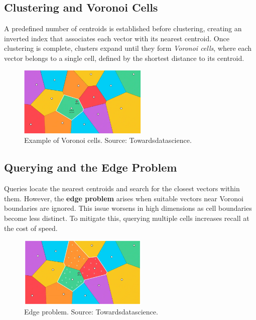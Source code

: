 \subsection{Clustering and Voronoi Cells}
A predefined number of centroids is established before clustering, creating an inverted index that associates each vector with its nearest centroid. Once clustering is complete, clusters expand until they form \textit{Voronoi cells}, where each vector belongs to a single cell, defined by the shortest distance to its centroid.
\begin{figure}[h]
    \centering
\includegraphics[width=0.55\textwidth]{IMAGES/immagine_2025-02-27_130909576.png}
    \caption{Example of Voronoi cells. Source: Towardsdatascience.\footnotemark[2]}
    \label{fig:Voronoi}
\end{figure}
\subsection{Querying and the Edge Problem}
Queries locate the nearest centroids and search for the closest vectors within them. However, the \textbf{edge problem} arises when suitable vectors near Voronoi boundaries are ignored. This issue worsens in high dimensions as cell boundaries become less distinct. To mitigate this, querying multiple cells increases recall at the cost of speed.
\begin{figure}[h]
    \centering
\includegraphics[width=0.55\textwidth]{IMAGES/immagine_2025-02-27_131611893.png}
    \caption{Edge problem. Source: Towardsdatascience.\footnotemark[2]}
    \label{fig:VoronoiEdges}
\end{figure}
